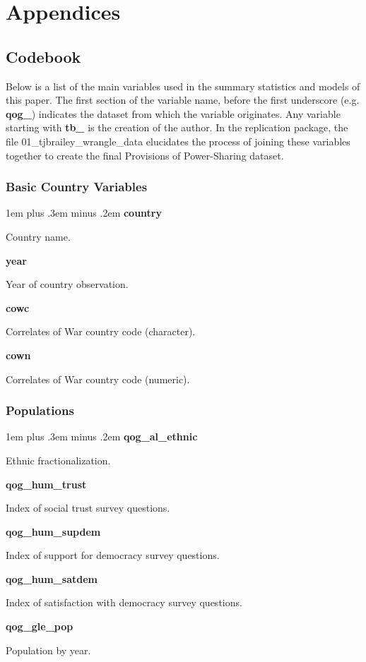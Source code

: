 \documentclass[12pt]{article}
\begin{document}
\nocite{*}



\pagebreak

\section{Appendices}
\subsection{Codebook}

Below is a list of the main variables used in the summary statistics and models of this paper. The first section of the variable name, before the first underscore (e.g. \textbf{qog\_}) indicates the dataset from which the variable originates. Any variable starting with \textbf{tb\_} is the creation of the author. In the replication package, the file 01\_tjbrailey\_wrangle\_data elucidates the process of joining these variables together to create the final Provisions of Power-Sharing dataset.  

\newlength\cbl
\newenvironment{codebook}[1][rob\_avprison1]{
	\settowidth{\cbl}{#1}
	\parskip1em plus .3em minus .2em
	\parindent0pt
	\def\code##1##2{{\bfseries ##1}\hfill
		\parbox[t]{\dimexpr\linewidth-15em-\cbl}{##2}\par}}{\noindent}

\subsubsection{Basic Country Variables}

\singlespacing
	
	\begin{codebook}
		\code{country}{Country name.}
		\code{year}{Year of country observation.}
		\code{cowc}{Correlates of War country code (character).}
		\code{cown}{Correlates of War country code (numeric).}
	\end{codebook}

\subsubsection{Populations}

\begin{codebook}
	\code{qog\_al\_ethnic}{Ethnic fractionalization.}
	\code{qog\_hum\_trust}{Index of social trust survey questions.}
	\code{qog\_hum\_supdem}{Index of support for democracy survey questions.}
	\code{qog\_hum\_satdem}{Index of satisfaction with democracy survey questions.}
	\code{qog\_gle\_pop}{Population by year.}
\end{codebook}
\end{document}
